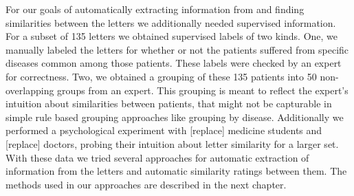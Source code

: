 \documentclass[Thesis.tex]{subfiles}
\begin{document}
For our goals of automatically extracting information from and finding similarities
between the letters we additionally needed supervised information.
For a subset of 135 letters we obtained supervised labels of two kinds.
One, we manually labeled the letters for whether or not the patients
suffered from specific diseases common among those patients. These
labels were checked by an expert %
 for correctness. Two, %
we obtained a grouping of these 135 patients into 50 non-overlapping groups from an expert.
This grouping is meant to reflect the expert's
intuition about similarities between patients, that might not be capturable
in simple rule based grouping approaches like grouping by disease. Additionally we performed a psychological experiment with {[}replace{]} medicine students and {[}replace{]} doctors, probing their intuition about letter similarity for a larger set. With these data we tried several
approaches for automatic extraction of information from the letters
and automatic similarity ratings between them. The methods used in our approaches are described in the next chapter.
\end{document}
